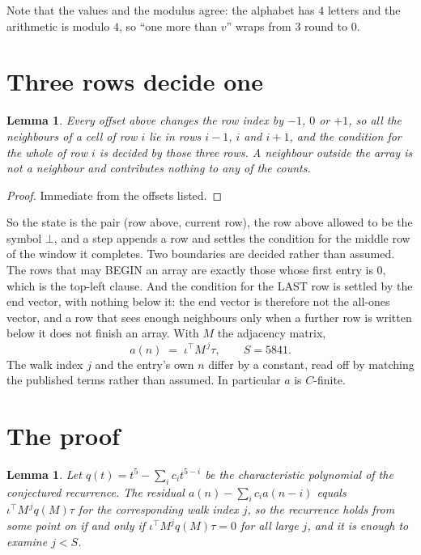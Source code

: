 \documentclass[11pt,a4paper]{article}
\theoremstyle{plain}
\newtheorem{lemma}[theorem]{Lemma}
\theoremstyle{definition}
\begin{document}
Note that the values and the modulus agree: the alphabet has $4$ letters and the arithmetic
is modulo $4$, so ``one more than $v$'' wraps from $3$ round to $0$.

\section{Three rows decide one}

\begin{lemma}\label{lem:win}
Every offset above changes the row index by $-1$, $0$ or $+1$, so all the neighbours of a cell
of row $i$ lie in rows $i-1$, $i$ and $i+1$, and the condition for the whole of row $i$ is
decided by those three rows. A neighbour outside the array is not a neighbour and contributes
nothing to any of the counts.
\end{lemma}

\begin{proof}
Immediate from the offsets listed.
\end{proof}

So the state is the pair (row above, current row), the row above allowed to be the symbol
$\bot$, and a step appends a row and settles the condition for the middle row of the window it
completes. Two boundaries are decided rather than assumed. The rows that may BEGIN an array are
exactly those whose first entry is $0$, which is the top-left clause. And the condition for the
LAST row is settled by the end vector, with nothing below it: the end vector is therefore not
the all-ones vector, and a row that sees enough neighbours only when a further row is written
below it does not finish an array. With $M$ the adjacency matrix,
\[
a(n)\;=\;\iota^{\!\top}M^{\,j}\tau ,\qquad S=5841.
\]
The walk index $j$ and the entry's own $n$ differ by a constant, read off by matching the
published terms rather than assumed. In particular $a$ is $C$-finite.

\section{The proof}

\begin{lemma}\label{lem:crit}
Let $q(t)=t^{5}-\sum_i c_it^{5-i}$ be the characteristic polynomial of the
conjectured recurrence. The residual $a(n)-\sum_ic_ia(n-i)$ equals
$\iota^{\!\top}M^{\,j}q(M)\tau$ for the corresponding walk index $j$, so the recurrence
holds from some point on if and only if $\iota^{\!\top}M^{j}q(M)\tau=0$ for all large $j$,
and it is enough to examine $j<S$.
\end{lemma}
\end{document}
